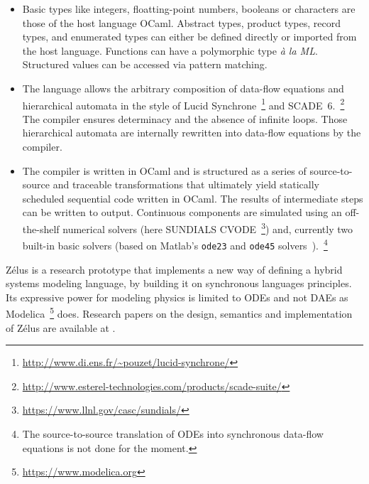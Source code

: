 \documentclass[11pt,titlepage,twoside]{report}
\newenvironment{flatitemize}
  {\begin{itemize}[leftmargin=*]}
  {\end{itemize}}
\newcommand{\zelus}{{\sf Z\'elus}}
\newcommand{\lucy}{{\sf Lucid Synchrone}}
\newcommand{\modelica}{{\sf Modelica}}
\newcommand{\scadesix}{{\sf SCADE~6}}
\newcommand{\ocaml}{{\sf OCaml}}
\begin{document}
\begin{flatitemize}
It is possible to reset the continuous variable defined by an \ac{ODE}
on a discrete clock. A \emph{zero-crossing} occurs when a 
continuous-time signal crosses zero from a negative value to a positive one 
during integration. A \emph{timer} is a particular case of a zero-crossing
event but it is implemented in a specific manner.

\item
  Basic types like integers, floatting-point numbers, booleans or
  characters are those of the host language \ocaml.  Abstract types,
  product types, record types, and enumerated types can either be
  defined directly or imported from the host language. Functions can
  have a polymorphic type \emph{à la ML}. Structured values can be
  accessed via pattern matching.
\item
The language allows the arbitrary composition of data-flow equations
and hierarchical automata in the style of
\lucy~\footnote{\url{http://www.di.ens.fr/~pouzet/lucid-synchrone/}}
and
\scadesix.~\footnote{\url{http://www.esterel-technologies.com/products/scade-suite/}}
The compiler ensures determinacy and the absence of infinite loops. Those
hierarchical automata are internally rewritten into data-flow equations by
the compiler.
\item
The compiler is written in \ocaml{} and is structured as a series of
source-to-source and traceable transformations that ultimately yield
statically scheduled sequential code written in \ocaml.
The results of intermediate steps can be written to output.
Continuous components are simulated using an off-the-shelf
numerical solvers (here SUNDIALS
CVODE~\footnote{\url{https://www.llnl.gov/casc/sundials/}}) and, currently
two built-in basic solvers (based on Matlab's \texttt{ode23} and
\texttt{ode45} solvers~\cite{ShampineGlaTho:ODEsMatlab:2003}).~\footnote{The
  source-to-source translation of ODEs into synchronous data-flow
equations is not done for the moment.}
\end{flatitemize}

\zelus{} is a research prototype that implements a new way of
defining a hybrid systems modeling language, by building it on
synchronous languages principles. Its expressive power for modeling physics
is limited to \acp{ODE} and not \acp{DAE} as
\modelica~\footnote{\url{https://www.modelica.org}} does. Research
papers on the design, semantics and implementation of \zelus{} are available at
.
\end{document}
